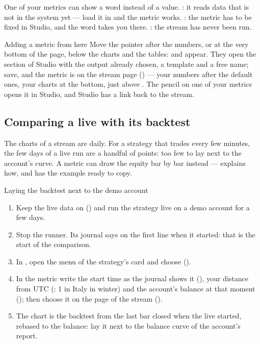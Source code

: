 \noindent
One of your metrics can show a word instead of a value. : it reads data that is not in the system yet --- load it in
 and the metric works. : the metric has to be fixed in Studio, and the word takes you there.
: the stream has never been run.

\begin{pratica}{Adding a metric from here}
Move the pointer after the numbers, or at the very bottom of the page, below
the charts and the tables:  and
 appear. They open the  section
of Studio with the output already chosen, a template and a free name; save,
and the metric is on the stream page () --- your
numbers after the default ones, your charts at the bottom, just above
. The pencil on one of your metrics opens it in
Studio, and Studio has a link back to the stream.
\end{pratica}

\subsection{Comparing a live with its backtest}\label{sez:stream-live-window}

The charts of a stream are daily. For a strategy that trades every few
minutes, the few days of a live run are a handful of points: too few to lay
next to the account's curve. A metric can draw the equity bar by bar instead
---  explains how, and has the example
ready to copy.

\begin{pratica}{Laying the backtest next to the demo account}
\begin{enumerate}
  \item Keep the live data on () and run the strategy live
        on a demo account for a few days.
  \item Stop the runner. Its journal says on the first line when it
        started: that is the start of the comparison.
  \item In , open the menu of the strategy's card and
        choose  ().
  \item In the metric write the start time as the journal shows it
        (), your distance from UTC (: 1 in Italy
        in winter) and the account's balance at that moment
        (); then choose it on the page of the stream
        ().
  \item The chart is the backtest from the last bar closed when the live
        started, rebased to the balance: lay it next to the balance curve of
        the account's report.
\end{enumerate}
\end{pratica}

